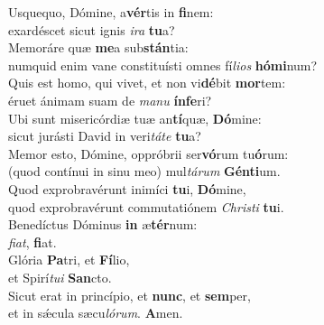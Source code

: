 \oddverse Usquequo, Dómine, a\textbf{vér}tis in \textbf{fi}nem:~\*\\
\oddverse exardéscet sicut ignis \textit{i}\textit{ra} \textbf{tu}a?\\
\evenverse Memoráre quæ \textbf{me}a sub\textbf{stán}tia:~\*\\
\evenverse numquid enim vane constituísti omnes fí\textit{li}\textit{os} \textbf{hó}\textbf{mi}num?\\
\oddverse Quis est homo, qui vivet, et non vi\textbf{dé}bit \textbf{mor}tem:~\*\\
\oddverse éruet ánimam suam de \textit{ma}\textit{nu} \textbf{ín}\textbf{fe}ri?\\
\evenverse Ubi sunt misericórdiæ tuæ an\textbf{tí}quæ, \textbf{Dó}mine:~\*\\
\evenverse sicut jurásti David in veri\textit{tá}\textit{te} \textbf{tu}a?\\
\oddverse Memor esto, Dómine, oppróbrii ser\textbf{vó}rum tu\textbf{ó}rum:~\*\\
\oddverse (quod contínui in sinu meo) mul\textit{tá}\textit{rum} \textbf{Gén}\textbf{ti}um.\\
\evenverse Quod exprobravérunt inimíci \textbf{tu}i, \textbf{Dó}mine,~\*\\
\evenverse quod exprobravérunt commutatiónem \textit{Chri}\textit{sti} \textbf{tu}i.\\
\oddverse Benedíctus Dóminus \textbf{in} æ\textbf{tér}num:~\*\\
\oddverse \textit{fi}\textit{at}, \textbf{fi}at.\\
\evenverse Glória \textbf{Pa}tri, et \textbf{Fí}lio,~\*\\
\evenverse et Spirí\textit{tu}\textit{i} \textbf{San}cto.\\
\oddverse Sicut erat in princípio, et \textbf{nunc}, et \textbf{sem}per,~\*\\
\oddverse et in sǽcula sæcu\textit{ló}\textit{rum}. \textbf{A}men.\\
